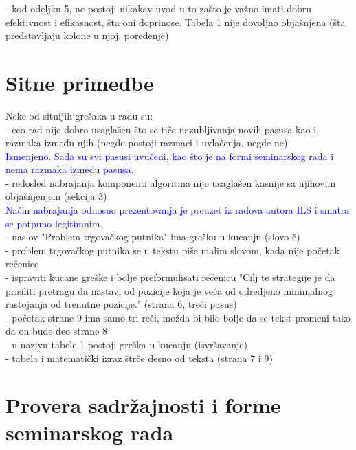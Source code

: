 \documentclass[a4paper]{report}
\newcommand{\odgovor}[1]{\textcolor{blue}{#1}}
\begin{document}
- kod odeljku 5, ne postoji nikakav uvod u to zašto je važno imati dobru efektivnost i efikasnost, šta oni doprinose. Tabela 1 nije dovoljno objašnjena (šta predstavljaju kolone u njoj, poređenje)


\section{Sitne primedbe}

Neke od sitnijih grešaka u radu su: \\
- ceo rad nije dobro usaglašen što se tiče nazubljivanja novih pasusa kao i razmaka između njih (negde postoji razmaci i uvlačenja, negde ne)\\
\odgovor{Izmenjeno. Sada su svi pasusi uvučeni, kao što je na formi seminarskog rada i nema razmaka između pasusa.\\}
- redosled nabrajanja komponenti algoritma nije usaglašen kasnije sa njihovim objašnjenjem  (sekcija 3)\\
\odgovor{Način nabrajanja odnosno prezentovanja je preuzet iz radova autora ILS i smatra se potpuno legitimnim.\\}
- naslov "Problem trgovačkog putnika" ima grešku u kucanju (slovo č)\\
- problem trgovačkog putnika se u tekstu piše malim slovom, kada nije početak rečenice\\
- ispraviti kucane greške i bolje preformulisati rečenicu "Cilj te strategije je da prisiliti pretragu da nastavi od pozicije koja je veća od odredjeno minimalnog rastojanja od trenutne pozicije." (strana 6, treći pasus)\\
- početak strane 9 ima samo tri reči, možda bi bilo bolje da se tekst promeni tako da on bude deo strane 8\\
- u nazivu tabele 1 postoji greška u kucanju (isvršavanje)\\
- tabela i matematički izraz štrče desno od teksta (strana 7 i 9)



\section{Provera sadržajnosti i forme seminarskog rada}
\end{document}
